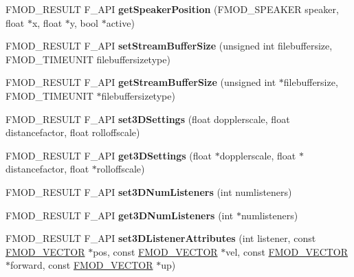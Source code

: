 \begin{DoxyCompactItemize}
F\+M\+O\+D\+\_\+\+R\+E\+S\+U\+LT F\+\_\+\+A\+PI {\bfseries get\+Speaker\+Position} (F\+M\+O\+D\+\_\+\+S\+P\+E\+A\+K\+ER speaker, float $\ast$x, float $\ast$y, bool $\ast$active)
\item 
\mbox{\label{classFMOD_1_1System_a3a1af0fad360c049a38df4abcb14380c}} 
F\+M\+O\+D\+\_\+\+R\+E\+S\+U\+LT F\+\_\+\+A\+PI {\bfseries set\+Stream\+Buffer\+Size} (unsigned int filebuffersize, F\+M\+O\+D\+\_\+\+T\+I\+M\+E\+U\+N\+IT filebuffersizetype)
\item 
\mbox{\label{classFMOD_1_1System_a363f5ab0586dd5a10e091986fc2e6a3f}} 
F\+M\+O\+D\+\_\+\+R\+E\+S\+U\+LT F\+\_\+\+A\+PI {\bfseries get\+Stream\+Buffer\+Size} (unsigned int $\ast$filebuffersize, F\+M\+O\+D\+\_\+\+T\+I\+M\+E\+U\+N\+IT $\ast$filebuffersizetype)
\item 
\mbox{\label{classFMOD_1_1System_a107414e588b619f0883570efa92da2ca}} 
F\+M\+O\+D\+\_\+\+R\+E\+S\+U\+LT F\+\_\+\+A\+PI {\bfseries set3\+D\+Settings} (float dopplerscale, float distancefactor, float rolloffscale)
\item 
\mbox{\label{classFMOD_1_1System_a3d437ae627c22704714a274c310b8966}} 
F\+M\+O\+D\+\_\+\+R\+E\+S\+U\+LT F\+\_\+\+A\+PI {\bfseries get3\+D\+Settings} (float $\ast$dopplerscale, float $\ast$distancefactor, float $\ast$rolloffscale)
\item 
\mbox{\label{classFMOD_1_1System_a33a3a5b785baf3eb09a7428ea2beb495}} 
F\+M\+O\+D\+\_\+\+R\+E\+S\+U\+LT F\+\_\+\+A\+PI {\bfseries set3\+D\+Num\+Listeners} (int numlisteners)
\item 
\mbox{\label{classFMOD_1_1System_a6909226f2d3f918a3a6900e35476cdbc}} 
F\+M\+O\+D\+\_\+\+R\+E\+S\+U\+LT F\+\_\+\+A\+PI {\bfseries get3\+D\+Num\+Listeners} (int $\ast$numlisteners)
\item 
\mbox{\label{classFMOD_1_1System_a0e24af3c714aab78000e13cf522a3bfc}} 
F\+M\+O\+D\+\_\+\+R\+E\+S\+U\+LT F\+\_\+\+A\+PI {\bfseries set3\+D\+Listener\+Attributes} (int listener, const \hyperlink{structFMOD__VECTOR}{F\+M\+O\+D\+\_\+\+V\+E\+C\+T\+OR} $\ast$pos, const \hyperlink{structFMOD__VECTOR}{F\+M\+O\+D\+\_\+\+V\+E\+C\+T\+OR} $\ast$vel, const \hyperlink{structFMOD__VECTOR}{F\+M\+O\+D\+\_\+\+V\+E\+C\+T\+OR} $\ast$forward, const \hyperlink{structFMOD__VECTOR}{F\+M\+O\+D\+\_\+\+V\+E\+C\+T\+OR} $\ast$up)

\end{DoxyCompactItemize}
